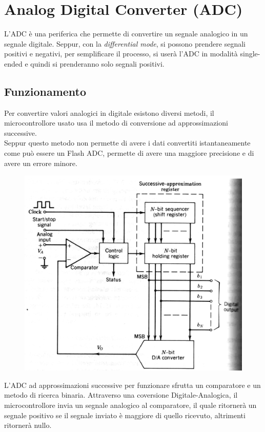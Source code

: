 \pagebreak
\section{Analog Digital Converter (ADC)}
L'ADC è una periferica che permette di convertire un segnale analogico in un segnale digitale. Seppur, con la \textit{differential mode}, si possono prendere segnali positivi e negativi, per semplificare il processo, si userà l'ADC in modalità single-ended e quindi si prenderanno solo segnali positivi.\\

\subsection{Funzionamento}
Per convertire valori analogici in digitale esistono diversi metodi, il microcontrollore usato usa il metodo di conversione ad approssimazioni successive.\\

Seppur questo metodo non permette di avere i dati convertiti istantaneamente come può essere un Flash ADC, permette di avere una maggiore precisione e di avere un errore minore.\\

\begin{figure}
    \includegraphics[width=0.8\linewidth]{microcontrollore/assets/ADC.png}
    \label{fig:ADC}
\end{figure}

L'ADC ad approssimazioni successive per funzionare sfrutta un comparatore e un metodo di ricerca binaria. Attraverso una coversione Digitale-Analogica, il microcontrollore invia un segnale analogico al comparatore, il quale ritornerà un segnale positivo se il segnale inviato è maggiore di quello ricevuto, altrimenti ritornerà nullo.\\

